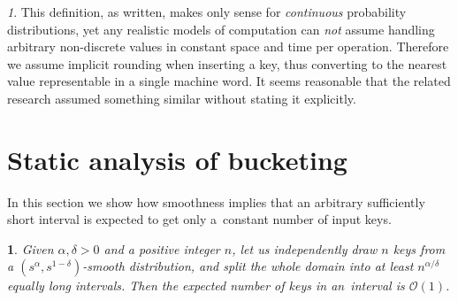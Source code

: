 \documentclass[
submission
]{dmtcs-episciences}
\theoremstyle{plain}
\theoremstyle{definition}
\theoremstyle{remark}
\newtheorem*{rem*}{\protect\remarkname}
\theoremstyle{plain}
\newtheorem*{lem*}{\protect\lemmaname}
\theoremstyle{plain}
\newcounter{lemma}
\providecommand{\lemmaname}{Lemma}
\providecommand{\remarkname}{Remark}
\def\OO{\mathcal O}
\begin{document}
\begin{rem*}
This definition, as written, makes only sense for \emph{continuous} probability
distributions, yet any realistic models of computation can
\emph{not} assume handling arbitrary non-discrete values in constant
space and time per operation. Therefore we assume implicit rounding
when inserting a key, thus converting to the nearest value representable
in a single machine word. It seems reasonable that the related research
assumed something similar without stating it explicitly.
\end{rem*}


\section{Static analysis of bucketing}
 \label{sec:smooth-bucket}
In this section we show how smoothness implies that an arbitrary sufficiently
short interval is expected to get only a~constant number of input keys.
\begin{lem*}
\label{lem:smooth-bucket}
Given $\alpha,\delta>0$ and a positive
integer $n$, let us independently draw $n$ keys from a $\left(s^{\alpha},s^{1-\delta}\right)$-smooth
distribution, and split the whole domain into at least $n^{\alpha/\delta}$
equally long intervals. Then the expected number of keys in an~interval
is $\OO(1)$.
\end{lem*}
\end{document}
